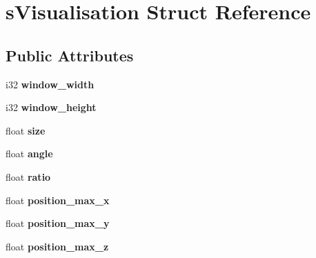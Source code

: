 \hypertarget{structsVisualisation}{\section{s\-Visualisation Struct Reference}
\label{structsVisualisation}
}
\subsection*{Public Attributes}
\begin{DoxyCompactItemize}
\item 
\hypertarget{structsVisualisation_a6f55371d0dfae2930c841caf63d606d7}{i32 {\bfseries window\-\_\-width}}\label{structsVisualisation_a6f55371d0dfae2930c841caf63d606d7}

\item 
\hypertarget{structsVisualisation_acc598e42a411c05bee4b9aed5b954790}{i32 {\bfseries window\-\_\-height}}\label{structsVisualisation_acc598e42a411c05bee4b9aed5b954790}

\item 
\hypertarget{structsVisualisation_aba3c48c2141ed751aef9481c12e7f11f}{float {\bfseries size}}\label{structsVisualisation_aba3c48c2141ed751aef9481c12e7f11f}

\item 
\hypertarget{structsVisualisation_a86342946290bdea4016c472fbc5bf2ea}{float {\bfseries angle}}\label{structsVisualisation_a86342946290bdea4016c472fbc5bf2ea}

\item 
\hypertarget{structsVisualisation_a32b06d36bc76f1f7a564add09c7598e9}{float {\bfseries ratio}}\label{structsVisualisation_a32b06d36bc76f1f7a564add09c7598e9}

\item 
\hypertarget{structsVisualisation_a93c5229f0e57f612ea1cf3cfbbac9386}{float {\bfseries position\-\_\-max\-\_\-x}}\label{structsVisualisation_a93c5229f0e57f612ea1cf3cfbbac9386}

\item 
\hypertarget{structsVisualisation_ace3bcfe425f13bed7352c448a4f1632d}{float {\bfseries position\-\_\-max\-\_\-y}}\label{structsVisualisation_ace3bcfe425f13bed7352c448a4f1632d}

\item 
\hypertarget{structsVisualisation_a99a98da3ed938821805edece74c8c72c}{float {\bfseries position\-\_\-max\-\_\-z}}\label{structsVisualisation_a99a98da3ed938821805edece74c8c72c}


\end{DoxyCompactItemize}
